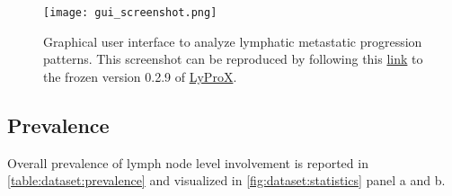 \documentclass[\relativeRoot/main.tex]{subfiles}
\begin{document}
\begin{figure}
    \centering
    \texttt{[image: gui\_screenshot.png]}
    \caption[Screenshot of the graphical user interface LyProX]{Graphical user interface to analyze lymphatic metastatic progression patterns. This screenshot can be reproduced by following this \href{https://2021-oropharynx.lyprox.org/dashboard/?nicotine_abuse=0&hpv_status=0&neck_dissection=-1&n_status=0&central=0&extension=1&subsite__in=base&subsite__in=tonsil&subsite__in=rest&t_stage__in=3&t_stage__in=4&institution__in=1&modalities=0&modalities=1&modalities=2&modalities=3&modality_combine=OR&contra_I=0&contra_Ia=0&contra_Ib=0&contra_II=0&contra_IIa=0&contra_IIb=0&contra_III=0&contra_IV=0&contra_V=0&contra_VII=0&ipsi_I=0&ipsi_Ia=0&ipsi_Ib=0&ipsi_II=1&ipsi_IIa=0&ipsi_IIb=0&ipsi_III=0&ipsi_IV=0&ipsi_V=0&ipsi_VII=0&show_percent=False&render=dashboard}{ link} to the frozen version 0.2.9 of \href{https://lyprox.org}{ LyProX}.}
    \label{fig:dataset:gui_screenshot}
\end{figure}

\subsection*{Prevalence}

Overall prevalence of lymph node level involvement is reported in \cref{table:dataset:prevalence} and visualized in \cref{fig:dataset:statistics} panel a and b.
\end{document}
